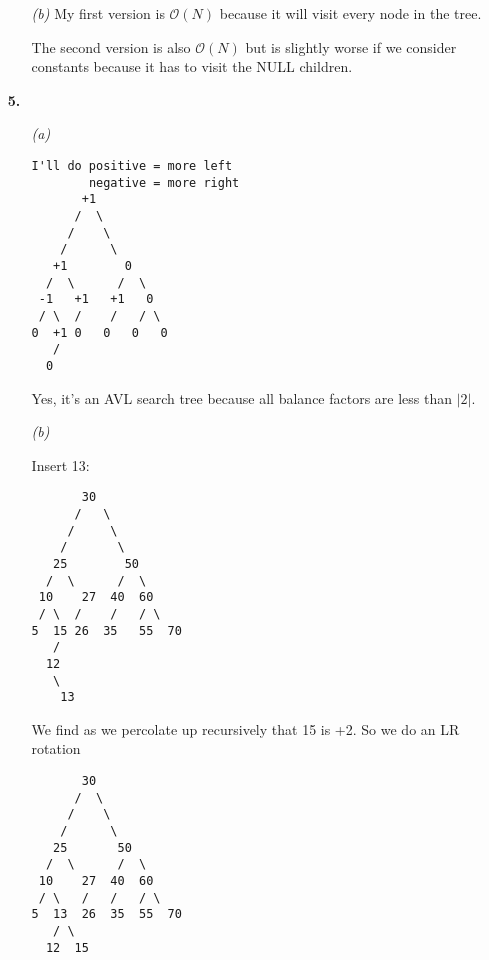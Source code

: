 \documentclass{article}
\begin{document}
\begin{enumerate}
\begin{enumerate}
    \item[\emph{(b)}]
      My first version is $ \mathcal{O}(N) $ because it will visit every
      node in the tree.

      The second version is also $ \mathcal{O}(N) $ but is slightly worse if
      we consider constants because it has to visit the NULL children.

  \end{enumerate}

\item[\textbf{5.}]

\begin{enumerate}

  \begin{enumerate}
    \item[\emph{(a)}]
    \begin{minipage}[t]{\linewidth}
    \begin{verbatim}
I'll do positive = more left
        negative = more right
       +1                        
      /  \                      
     /    \                   
    /      \
   +1        0                
  /  \      /  \              
 -1   +1   +1   0           
 / \  /    /   / \
0  +1 0   0   0   0          
   /
  0 
    \end{verbatim}
    \end{minipage}

    Yes, it's an AVL search tree because all balance factors are less than
    $|2|$.


    \item[\emph{(b)}]
    
Insert 13:

    \begin{minipage}[t]{\linewidth}
    \begin{verbatim}
       30                        
      /   \                      
     /     \                   
    /       \
   25        50                
  /  \      /  \              
 10    27  40  60           
 / \  /    /   / \
5  15 26  35   55  70          
   /
  12
   \
    13
    \end{verbatim}
    \end{minipage}

We find as we percolate up recursively that 15 is +2. 
So we do an LR rotation

    \begin{minipage}[t]{\linewidth}
    \begin{verbatim}
       30                        
      /  \                      
     /    \                   
    /      \
   25       50                
  /  \      /  \              
 10    27  40  60           
 / \   /   /   / \
5  13  26  35  55  70          
   / \
  12  15
    \end{verbatim}
    \end{minipage}


\end{enumerate}
\end{enumerate}
\end{enumerate}
\end{document}
